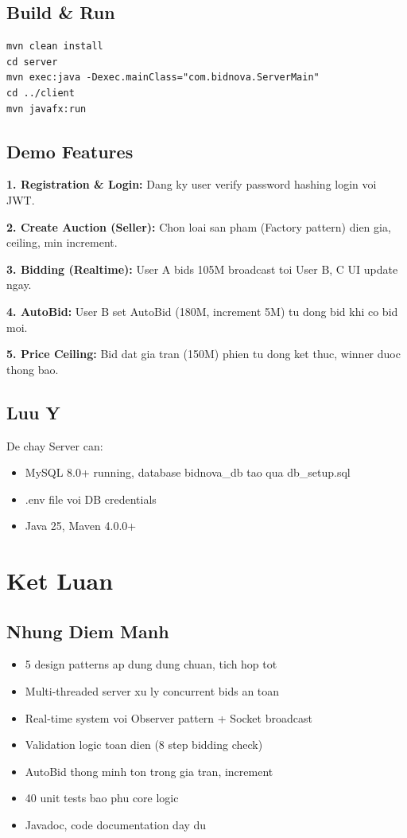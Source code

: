 ﻿\documentclass[12pt, a4paper]{report}
\begin{document}
\section{Build \& Run}
\begin{lstlisting}
mvn clean install
cd server
mvn exec:java -Dexec.mainClass="com.bidnova.ServerMain"
cd ../client
mvn javafx:run
\end{lstlisting}

\section{Demo Features}
\textbf{1. Registration \& Login:} Dang ky user verify password hashing login voi JWT.

\textbf{2. Create Auction (Seller):} Chon loai san pham (Factory pattern) dien gia, ceiling, min increment.

\textbf{3. Bidding (Realtime):} User A bids 105M broadcast toi User B, C UI update ngay.

\textbf{4. AutoBid:} User B set AutoBid (180M, increment 5M) tu dong bid khi co bid moi.

\textbf{5. Price Ceiling:} Bid dat gia tran (150M) phien tu dong ket thuc, winner duoc thong bao.

\section{Luu Y}
De chay Server can:
\begin{itemize}
    \item MySQL 8.0+ running, database bidnova\_db tao qua db\_setup.sql
    \item .env file voi DB credentials
    \item Java 25, Maven 4.0.0+
\end{itemize}

\newpage

\chapter{Ket Luan}

\section{Nhung Diem Manh}
\begin{itemize}
    \item 5 design patterns ap dung dung chuan, tich hop tot
    \item Multi-threaded server xu ly concurrent bids an toan
    \item Real-time system voi Observer pattern + Socket broadcast
    \item Validation logic toan dien (8 step bidding check)
    \item AutoBid thong minh ton trong gia tran, increment
    \item 40 unit tests bao phu core logic
    \item Javadoc, code documentation day du
\end{itemize}
\end{document}
